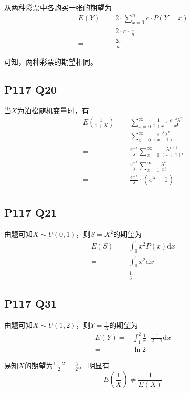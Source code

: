 \documentclass[a4paper,12pt]{ctexart}
\begin{document}
从两种彩票中各购买一张的期望为
\begin{align*}
	E(Y) =& 2 \cdot \sum_{x=0}^{n} c \cdot P(Y = x) \\
	=& 2 \cdot c \cdot \frac{1}{n} \\
	=& \frac{2c}{n}
\end{align*}

可知，两种彩票的期望相同。

\subsection*{P117 Q20}

当$X$为泊松随机变量时，有
\begin{align*}
	E\left(\frac{1}{1+X}\right) =& \sum_{x=0}^{\infty} \frac{1}{1+x} \cdot \frac{e^{-\lambda} \lambda^x}{x!} \\
	=& \sum_{x=0}^{\infty} \frac{e^{-\lambda} \lambda^x}{(x+1)!} \\
	=& \frac{e^{-\lambda} }{\lambda} \sum_{x=0}^{\infty} \frac{\lambda^{x+1}}{(x+1)!} \\
	=& \frac{e^{-\lambda} }{\lambda} \sum_{x=1}^{\infty} \frac{\lambda^{x}}{x!} \\
	=& \frac{e^{-\lambda} }{\lambda} \cdot (e^{\lambda} - 1) \\
\end{align*}

\subsection*{P117 Q21}

由题可知$X \sim U(0,1)$，则$S = X^2$的期望为
\begin{align*}
	E(S) =& \int_{0}^{1} x^2 P(x) \mathrm{d}x \\
	=& \int_{0}^{1} x^2 \mathrm{d}x \\
	=& \frac{1}{3}
\end{align*}

\subsection*{P117 Q31}

由题可知$X \sim U(1,2)$，则$Y = \frac{1}{X}$的期望为
\begin{align*}
	E(Y) =& \int_{1}^{2} \frac{1}{x} \cdot \frac{1}{2-1} \mathrm{d}x \\
	=& \ln 2
\end{align*}

易知$X$的期望为$\frac{1+2}{2} = \frac{3}{2}$。
明显有
\begin{equation*}
	E\left(\frac{1}{X}\right) \neq \frac{1}{E(X)}
\end{equation*}
\end{document}
